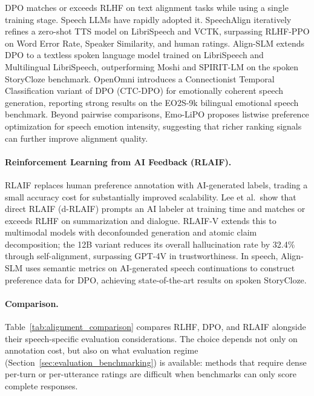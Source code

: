 DPO matches or exceeds RLHF on text alignment tasks while using a single
training stage. Speech LLMs have rapidly adopted it. SpeechAlign
\citep{zhang2024speechalignaligningspeechgeneration} iteratively refines a
zero-shot TTS model on LibriSpeech and VCTK, surpassing RLHF-PPO on Word
Error Rate, Speaker Similarity, and human ratings. Align-SLM
\citep{lin2025alignslmtextlessspokenlanguage} extends DPO to a textless
spoken language model trained on LibriSpeech and Multilingual LibriSpeech,
outperforming Moshi and SPIRIT-LM on the spoken StoryCloze benchmark.
OpenOmni \citep{luo2025openomniadvancingopensourceomnimodal} introduces a
Connectionist Temporal Classification variant of DPO (CTC-DPO) for
emotionally coherent speech generation, reporting strong results on the
EO2S-9k bilingual emotional speech benchmark. Beyond pairwise
comparisons, Emo-LiPO \citep{lin2026emolipo} proposes listwise preference
optimization for speech emotion intensity, suggesting that richer
ranking signals can further improve alignment quality.

\paragraph{Reinforcement Learning from AI Feedback (RLAIF).}
RLAIF \citep{lee2024rlaifvsrlhfscaling,bai2022constitutionalaiharmlessnessai}
replaces human preference annotation with AI-generated labels, trading a
small accuracy cost for substantially improved scalability. Lee et al.\
show that direct RLAIF (d-RLAIF) prompts an AI labeler at training time
and matches or exceeds RLHF on summarization and dialogue. RLAIF-V
\citep{yu2024rlaifvopensourceaifeedback} extends this to multimodal models
with deconfounded generation and atomic claim decomposition; the 12B
variant reduces its overall hallucination rate by 32.4\% through
self-alignment, surpassing GPT-4V in trustworthiness. In speech,
Align-SLM \citep{lin2025alignslmtextlessspokenlanguage} uses semantic
metrics on AI-generated speech continuations to construct preference data
for DPO, achieving state-of-the-art results on spoken StoryCloze.

\paragraph{Comparison.}
Table~\ref{tab:alignment_comparison} compares RLHF, DPO, and RLAIF
alongside their speech-specific evaluation considerations. The choice
depends not only on annotation cost, but also on what evaluation regime
(Section~\ref{sec:evaluation_benchmarking}) is available: methods that
require dense per-turn or per-utterance ratings are difficult when
benchmarks can only score complete responses.

